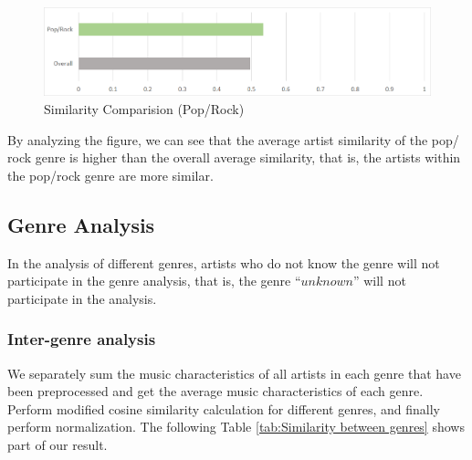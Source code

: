 \documentclass[12pt]{article}  %
\begin{document}
\begin{figure}[htbp]
\centering
\includegraphics[width=.9\textwidth]{img/Pop Similarity.jpg}
\caption{Similarity Comparision (Pop/Rock)}\label{fig:Pop Similarity}
\end{figure}

By analyzing the figure, we can see that the average artist similarity of the pop/
rock genre is higher than the overall average similarity, that is, the artists within the pop/rock genre are more similar.


\subsection{Genre Analysis }

In the analysis of different genres, artists who do not know the genre will not participate in the genre analysis, that is, the genre “$unknown$” will not participate in the analysis. 

\subsubsection{Inter-genre analysis }

We separately sum the music characteristics of all artists in each genre that have been preprocessed and get the average music characteristics of each genre. Perform modified cosine similarity calculation for different genres, and finally perform normalization. The following Table \ref{tab:Similarity between genres} shows part of our result.
\end{document}
